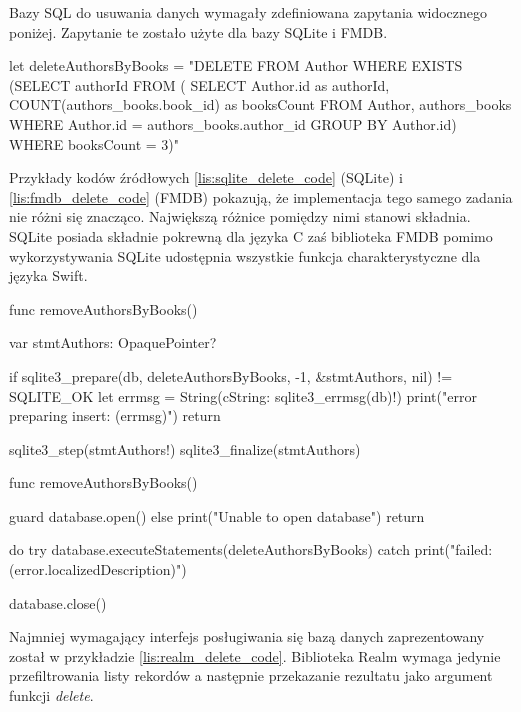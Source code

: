 Bazy SQL do usuwania danych wymagały zdefiniowana zapytania widocznego poniżej. Zapytanie te zostało użyte dla bazy SQLite i FMDB.

\begin{code}[
		language=swift,
		caption={Zapytanie SQL do usuwania danych},
		label={lis:sql_delete_query_code},
	]
let deleteAuthorsByBooks = "DELETE FROM Author WHERE EXISTS (SELECT authorId FROM ( SELECT Author.id as authorId, COUNT(authors_books.book_id) as booksCount FROM Author, authors_books WHERE Author.id = authors_books.author_id GROUP BY Author.id) WHERE booksCount = 3)"
\end{code}

Przykłady kodów źródłowych \ref{lis:sqlite_delete_code} (SQLite) i \ref{lis:fmdb_delete_code} (FMDB) pokazują, że implementacja tego samego zadania nie różni się znacząco. Największą różnice pomiędzy nimi stanowi składnia. SQLite posiada składnie pokrewną dla języka C zaś biblioteka FMDB pomimo wykorzystywania SQLite udostępnia wszystkie funkcja charakterystyczne dla języka Swift. 

\begin{code}[
		language=swift,
		caption={Przykład usuwania danych SQLite},
		label={lis:sqlite_delete_code},
	]
    func removeAuthorsByBooks() {
        var stmtAuthors: OpaquePointer?
        
        if sqlite3_prepare(db, deleteAuthorsByBooks, -1, &stmtAuthors, nil) != SQLITE_OK {
            let errmsg = String(cString: sqlite3_errmsg(db)!)
            print("error preparing insert: (errmsg)")
            return
        }
        
        sqlite3_step(stmtAuthors!)
        sqlite3_finalize(stmtAuthors)
    }
\end{code}

\begin{code}[
		language=swift,
		caption={Przykład usuwania danych FMDB},
		label={lis:fmdb_delete_code},
	]
    func removeAuthorsByBooks() {
        guard database.open() else {
            print("Unable to open database")
            return
        }

        do {
            try database.executeStatements(deleteAuthorsByBooks)
        } catch {
            print("failed: (error.localizedDescription)")
        }
        
        database.close()
    }
\end{code}

Najmniej wymagający interfejs posługiwania się bazą danych zaprezentowany został w przykładzie \ref{lis:realm_delete_code}. Biblioteka Realm wymaga jedynie przefiltrowania listy rekordów a następnie przekazanie rezultatu jako argument funkcji \textit{delete}. 


